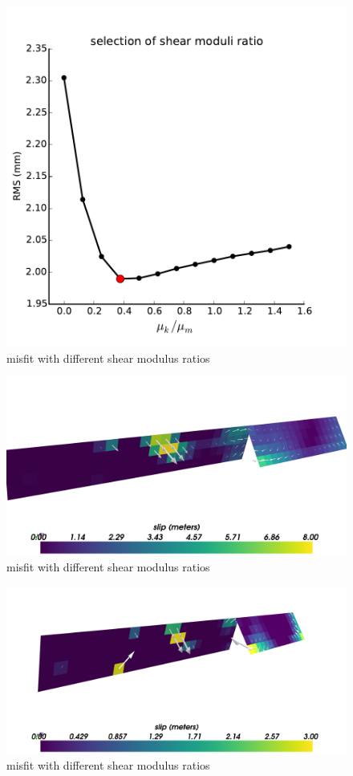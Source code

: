 \documentclass[12pt]{article}
\begin{document}
\begin{figure}
\includegraphics[scale=1.0]{Figures/shear_ratio}
\centering 
\caption{misfit with different shear modulus ratios}
\label{ShearRatio}
\end{figure} 

\begin{figure}
\includegraphics[scale=0.1]{Figures/final_coseismic}
\centering 
\caption{misfit with different shear modulus ratios}
\label{ShearRatio}
\end{figure} 

\begin{figure}
\includegraphics[scale=0.1]{Figures/final_afterslip_0-1}
\centering 
\caption{misfit with different shear modulus ratios}
\label{ShearRatio}
\end{figure} 
\end{document}
